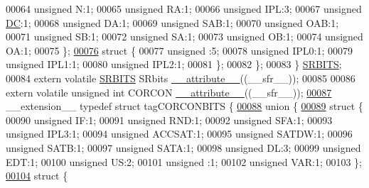 \begin{DoxyCode}
00064       \textcolor{keywordtype}{unsigned} N:1;
00065       \textcolor{keywordtype}{unsigned} RA:1;
00066       \textcolor{keywordtype}{unsigned} IPL:3;
00067       \textcolor{keywordtype}{unsigned} \hyperlink{a00017_a0caba21dab832e280875be65012b30fc}{DC}:1;
00068       \textcolor{keywordtype}{unsigned} DA:1;
00069       \textcolor{keywordtype}{unsigned} SAB:1;
00070       \textcolor{keywordtype}{unsigned} OAB:1;
00071       \textcolor{keywordtype}{unsigned} SB:1;
00072       \textcolor{keywordtype}{unsigned} SA:1;
00073       \textcolor{keywordtype}{unsigned} OB:1;
00074       \textcolor{keywordtype}{unsigned} OA:1;
00075     \};
\hypertarget{a00015_source_l00076}{}\hyperlink{a00015}{00076}     \textcolor{keyword}{struct }\{
00077       \textcolor{keywordtype}{unsigned} :5;
00078       \textcolor{keywordtype}{unsigned} IPL0:1;
00079       \textcolor{keywordtype}{unsigned} IPL1:1;
00080       \textcolor{keywordtype}{unsigned} IPL2:1;
00081     \};
00082   \};
00083 \} \hyperlink{a00014_de/d42/a00780}{SRBITS};
00084 \textcolor{keyword}{extern} \textcolor{keyword}{volatile} \hyperlink{a00014_de/d42/a00780}{SRBITS} SRbits \hyperlink{a00015_a493c46f03454991ccc5aa7a6e1dfb2a7}{\_\_attribute\_\_}((\_\_sfr\_\_));
00085 
00086 \textcolor{keyword}{extern} \textcolor{keyword}{volatile} \textcolor{keywordtype}{unsigned} \textcolor{keywordtype}{int}  CORCON \hyperlink{a00015_a493c46f03454991ccc5aa7a6e1dfb2a7}{\_\_attribute\_\_}((\_\_sfr\_\_));
\hypertarget{a00015_source_l00087}{}\hyperlink{a00014}{00087} \_\_extension\_\_ \textcolor{keyword}{typedef} \textcolor{keyword}{struct }tagCORCONBITS \{
\hypertarget{a00015_source_l00088}{}\hyperlink{a00015}{00088}   \textcolor{keyword}{union }\{
\hypertarget{a00015_source_l00089}{}\hyperlink{a00015}{00089}     \textcolor{keyword}{struct }\{
00090       \textcolor{keywordtype}{unsigned} IF:1;
00091       \textcolor{keywordtype}{unsigned} RND:1;
00092       \textcolor{keywordtype}{unsigned} SFA:1;
00093       \textcolor{keywordtype}{unsigned} IPL3:1;
00094       \textcolor{keywordtype}{unsigned} ACCSAT:1;
00095       \textcolor{keywordtype}{unsigned} SATDW:1;
00096       \textcolor{keywordtype}{unsigned} SATB:1;
00097       \textcolor{keywordtype}{unsigned} SATA:1;
00098       \textcolor{keywordtype}{unsigned} DL:3;
00099       \textcolor{keywordtype}{unsigned} EDT:1;
00100       \textcolor{keywordtype}{unsigned} US:2;
00101       \textcolor{keywordtype}{unsigned} :1;
00102       \textcolor{keywordtype}{unsigned} VAR:1;
00103     \};
\hypertarget{a00015_source_l00104}{}\hyperlink{a00015}{00104}     \textcolor{keyword}{struct }\{

\end{DoxyCode}
